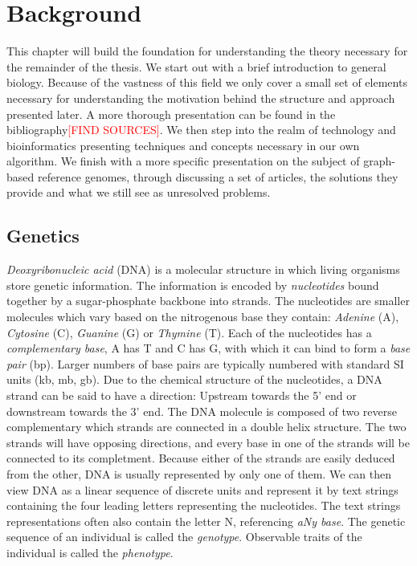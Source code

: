 \documentclass[thesis.tex]{subfiles}
\begin{document}
\chapter{Background}
This chapter will build the foundation for understanding the theory necessary for the remainder of the thesis. We start out with a brief introduction to general biology. Because of the vastness of this field we only cover a small set of elements necessary for understanding the motivation behind the structure and approach presented later. A more thorough presentation can be found in the bibliography\textcolor{red}{[FIND SOURCES]}. We then step into the realm of technology and bioinformatics presenting techniques and concepts necessary in our own algorithm. We finish with a more specific presentation on the subject of graph-based reference genomes, through discussing a set of articles, the solutions they provide and what we still see as unresolved problems.
\section{Genetics}
\textit{Deoxyribonucleic acid} (DNA) is a molecular structure in which living organisms store genetic information. The information is encoded by \textit{nucleotides} bound together by a sugar-phosphate backbone into strands. The nucleotides are smaller molecules which vary based on the nitrogenous base they contain: \textit{Adenine} (A), \textit{Cytosine} (C), \textit{Guanine} (G) or \textit{Thymine} (T). Each of the nucleotides has a \textit{complementary base}, A has T and C has G, with which it can bind to form a \textit{base pair} (bp). Larger numbers of base pairs are typically numbered with standard SI units (kb, mb, gb). Due to the chemical structure of the nucleotides, a DNA strand can be said to have a direction: Upstream towards the 5' end or downstream towards the 3' end. The DNA molecule is composed of two reverse complementary which strands are connected in a double helix structure. The two strands will have opposing directions, and every base in one of the strands will be connected to its completment. Because either of the strands are easily deduced from the other, DNA is usually represented by only one of them. We can then view DNA as a linear sequence of discrete units and represent it by text strings containing the four leading letters representing the nucleotides. The text strings representations often also contain the letter N, referencing \textit{aNy base}. The genetic sequence of an individual is called the \textit{genotype}. Observable traits of the individual is called the \textit{phenotype}.
\end{document}
